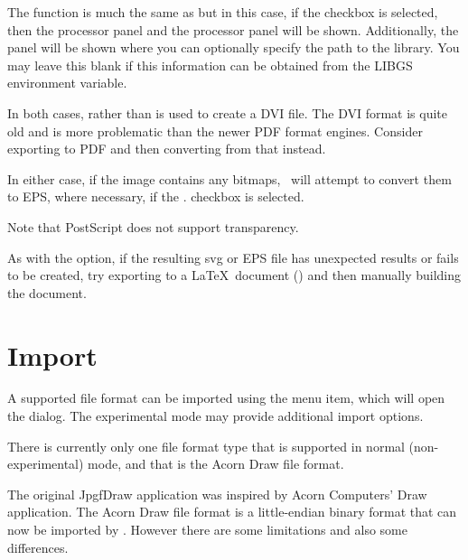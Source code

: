 The  function is much the same as
 but in this case, if the   checkbox is
selected, then the 
 processor panel and the
 processor panel will be shown.
Additionally, the  panel will be shown
where you can optionally specify the path to the 
library. You may leave this blank if this information can be
obtained from the \gls{LIBGS} environment variable.

\begin{warning}
In both cases,  rather than  is used to
create a DVI file. The DVI format is quite old and is more
problematic than the newer PDF format engines. Consider exporting to
PDF and then converting from that instead.
\end{warning}


In either case, if the image contains any
\glspl{bitmap}, \FlowframTk\ will attempt to convert
them to EPS, where necessary, if the .
checkbox is selected.

\begin{important}
Note that PostScript does not support transparency.
\end{important}

As with the  option, if the resulting \gls{svg} or EPS
file has unexpected results or fails to be created, try exporting to
a \LaTeX\ document () and then manually building the
document.

\section{Import}\label{sec:importimage}


A supported file format can be imported using the 
menu item, which will open the  dialog. The
experimental mode may provide additional import options.

\begin{information}
There is currently only one file format type that is supported in
normal (non-experimental) mode, and that is the Acorn Draw file
format.
\end{information}

The original \gls{JpgfDraw} application was inspired by Acorn Computers' Draw
application. The Acorn Draw file format is a little-endian binary format that can
now be imported by \FlowframTk. However there are some limitations
and also some differences.

